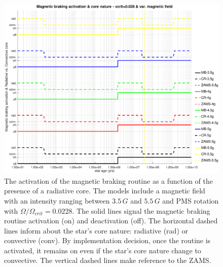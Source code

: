 \documentclass[fleqn,usenatbib]{mnras}
\begin{document}
\begin{figure}
	\includegraphics[trim = 30mm 15mm 15mm 15mm, clip,width=\columnwidth]{figures/mb_act_vc_028_var_g.eps}
    \caption{The activation of the magnetic braking routine as a function of the presence of a radiative core. The models include a magnetic field with an intensity ranging between $3.5\,G$ and $5.5\,G$ and PMS rotation with $\Omega / \Omega_{crit}=0.0228$. The solid lines signal the magnetic braking routine activation (on) and deactivation (off). The horizontal dashed lines inform about the star's core nature: radiative (rad) or convective (conv). By implementation decision, once the routine is activated, it remains on even if the star's core nature change to convective. The vertical dashed lines make reference to the ZAMS.}
    \label{fig:mb_act_var_vel_vc_028}
\end{figure}
\end{document}
